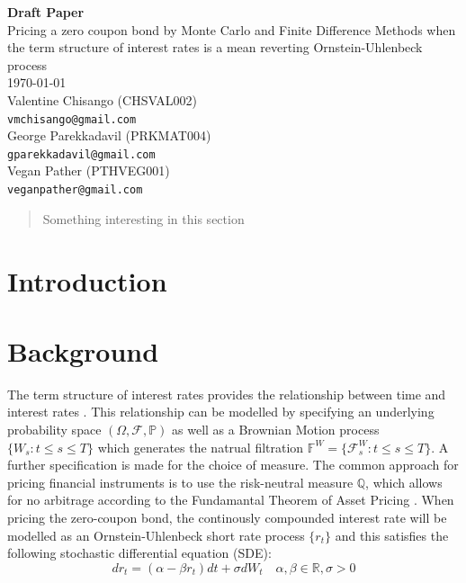 \documentclass[12pt,a4paper]{article}
\begin{document}
\begin{titlepage}
	
	\begin{center}
		\textbf{{\Large Draft Paper}}\\
		\vspace{1cm}
		{\Large Pricing a zero coupon bond by Monte Carlo and Finite Difference Methods when the term structure of interest rates is a mean reverting Ornstein-Uhlenbeck process}\\
		\vspace{1cm}
		\today\\
		Valentine Chisango (CHSVAL002)\\
		{\tt vmchisango@gmail.com}\\ 
		
		George Parekkadavil (PRKMAT004)\\
		{\tt gparekkadavil@gmail.com}\\
		
		Vegan Pather (PTHVEG001)\\
		\tt {veganpather@gmail.com}
		
	\end{center}

\begin{abstract}
	Something interesting in this section
\end{abstract}	

\end{titlepage}
\newpage

\section{Introduction}
\label{sec: Intro}

\newpage
\section{Background}
\label{sec: Backgrd}

The term structure of interest rates provides the relationship between time and interest rates \citep{hull2016options}. This relationship can be modelled by specifying an underlying probability space $(\Omega,\mathcal{F},\mathbb{P})$ as well as a Brownian Motion process $\{W_{s}:t \leq s \leq T\}$ which generates the natrual filtration $\mathbb{F}^{W} = \{\mathcal{F}_{s}^{W}: t \leq s \leq T\}$. A further specification is made for the choice of measure. The common approach for pricing financial instruments is to use the risk-neutral measure $\mathbb{Q}$, which allows for no arbitrage according to the Fundamantal Theorem of Asset Pricing \citep{shreve2004stochastic}. When pricing the zero-coupon bond, the continously compounded interest rate will be modelled as an Ornstein-Uhlenbeck short rate process $\{r_t\}$ and this satisfies the following stochastic differential equation (SDE): 
\begin{equation}
dr_{t} = (\alpha-\beta r_{t})dt + \sigma dW_{t} \quad \alpha, \beta \in \mathbb{R}, \sigma>0
\end{equation}
\end{document}
